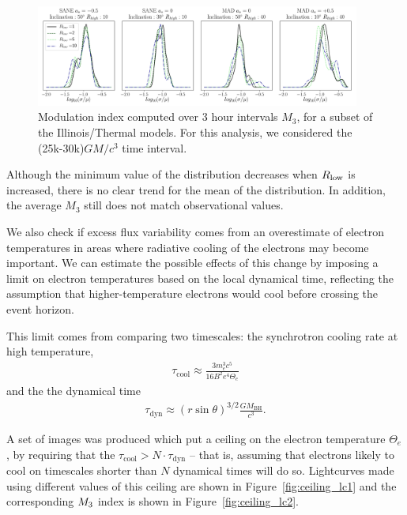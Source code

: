 \begin{figure}
\centering
\includegraphics[width=0.95\textwidth]{figures/mi_rlow_select_models.png}
\caption{Modulation index computed over 3 hour intervals $M_{3}$, for a subset of the Illinois/Thermal models. For this analysis, we considered the (25k-30k)$GM/c^{3}$ time interval.}
\label{fig:mi_rlow}
\end{figure}

Although the minimum value of the distribution decreases when $R_\mathrm{low}$ is increased, there is no clear trend for the mean of the distribution. In addition, the average $M_{3}$ still does not match observational values.



We also check if excess flux variability comes from an overestimate of electron temperatures in areas where radiative cooling of the electrons may become important. We can estimate the possible effects of this change by imposing a limit on electron temperatures based on the local dynamical time, reflecting the assumption that higher-temperature electrons would cool before crossing the event horizon.

This limit comes from comparing two timescales: the synchrotron cooling rate at high temperature,
\begin{align}
    \tau_\mathrm{cool} \approx \frac{3 m_e^3 c^5}{16 B^2 e^4 \Theta_e}
\end{align}
and the the dynamical time
\begin{align}
    \tau_\mathrm{dyn} \approx \left( r \sin{\theta} \right) ^{3/2} \frac{G M_\mathrm{BH}}{c^3}.
\end{align}

A set of images was produced which put a ceiling on the electron temperature $\Theta_e$, by requiring that the $\tau_\mathrm{cool} > N \cdot \tau_\mathrm{dyn}$ -- that is, assuming that electrons likely to cool on timescales shorter than $N$ dynamical times will do so. Lightcurves made using different values of this ceiling are shown in Figure~\ref{fig:ceiling_lc1} and the corresponding $M_{3}$ index is shown in Figure~\ref{fig:ceiling_lc2}.

